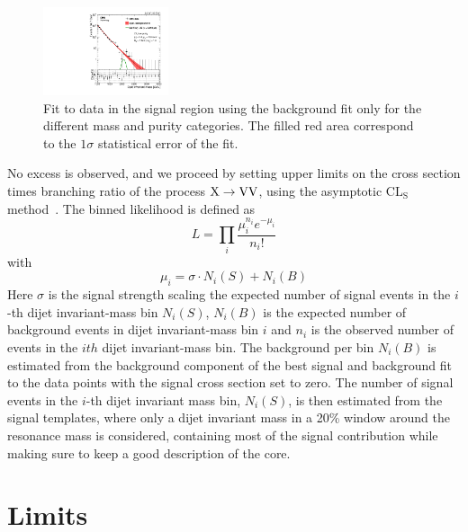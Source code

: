 \begin{figure}[h!]
\includegraphics[width=0.327\textwidth]{figures/analysis/search1/AN-15-211/fits/MLfits/BkgFit_DijetMassLowPuriZZ.pdf}
\caption{Fit to data in the signal region using the background fit only for the different mass and purity categories. The filled red area correspond to the $1 \sigma$  statistical error of the fit.}
\label{fig:search1:bkgfitMassCat}
\end{figure}
No excess is observed, and we proceed by setting upper limits on the cross section times branching ratio of the process $\text{X} \to \mathrm{V}\mathrm{V}$, using the asymptotic $\textrm{CL}_\textrm{S}$ method~\cite{CLs}. The binned likelihood is defined as
\begin{equation}
L = \prod_i\frac{\mu^{n_i}_ie^{-\mu_i}}{n_i!}
\end{equation}
with
\begin{equation}
\mu_i=\sigma \cdot N_i(S)+N_i(B)
\end{equation}
Here $\sigma$ is the signal strength scaling the expected number of signal events in the $i$-th dijet invariant-mass bin $N_i(S)$, $N_i(B)$ is the expected number of background events in dijet invariant-mass bin $i$ and $n_i$ is the observed number of events in the $ith$ dijet invariant-mass bin. The background per bin $N_i(B)$ is estimated from the background component of the best signal and background fit to the data points with the signal cross section set to zero. The number of signal events in the $i$-th dijet invariant mass bin, $N_i(S)$, is then estimated from the signal templates, where only a dijet invariant mass in a 20\% window around the resonance mass is considered, containing most of the signal contribution while making sure to keep a good description of the core.

\section{Limits}
